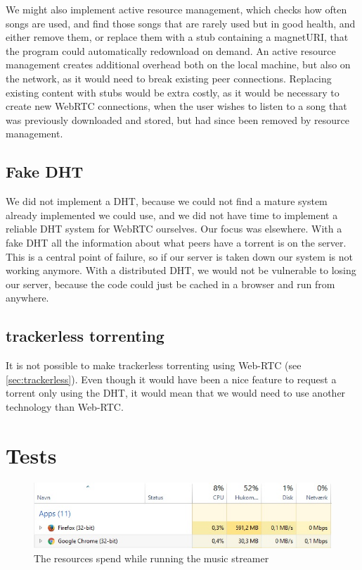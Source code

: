 We might also implement active resource management, which checks how often songs are used,
and find those songs that are rarely used but in good health, and either remove them,
or replace them with a stub containing a magnetURI, 
that the program could automatically redownload on demand.
An active resource management creates additional overhead both on the local machine,
but also on the network, as it would need to break existing peer connections.
Replacing existing content with stubs would be extra costly,
as it would be necessary to create new WebRTC connections,
when the user wishes to listen to a song that was previously downloaded and stored,
but had since been removed by resource management.

\subsection{Fake \acs{DHT}}
We did not implement a DHT, 
because we could not find a mature system already implemented we could use, 
and we did not have time to implement a reliable DHT system for WebRTC ourselves.
Our focus was elsewhere.
With a fake \acs{DHT} all the information about what peers have a torrent is on the server. 
This is a central point of failure, so if our server is taken down our system is not working anymore.
With a distributed \acs{DHT}, 
we would not be vulnerable to losing our server, 
because the code could just be cached in a browser and run from anywhere.

\subsection{trackerless torrenting}
It is not possible to make trackerless torrenting using Web-RTC (see \ref{sec:trackerless}). 
Even though it would have been a nice feature to request a torrent only using the \acs{DHT},
it would mean that we would need to use another technology than Web-RTC.

\section{Tests}
\begin{figure}[H]
	\centering
	\includegraphics[width=\linewidth]{gfx/streamerIdle}
	\caption{The resources spend while running the music streamer}
	\label{fig:streamer-idle}
\end{figure}

